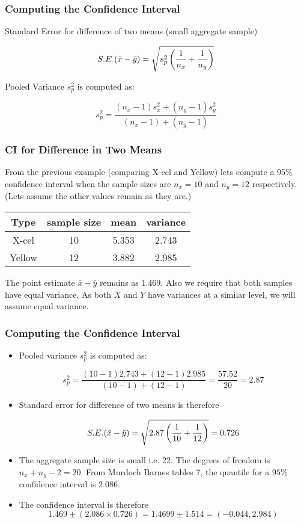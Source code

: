 \begin{frame}

\frametitle{Computing the Confidence Interval}
Standard Error for difference of two means (small aggregate sample)

\[ S.E.(\bar{x}-\bar{y}) = \sqrt{  s^2_p \left({1\over n_x}+{1\over n_y} \right)} \]

Pooled Variance $s^2_p$ is computed as:

\[ s^2_p = \frac{(n_x-1)s^2_x + (n_y-1)s^2_y}{(n_x-1) + (n_y-1)} \]
\end{frame}
\begin{frame}
\frametitle{CI for Difference in Two Means}
From the previous example (comparing X-cel and Yellow) lets compute a 95\% confidence interval when the sample sizes are $n_x=10$ and $n_y=12$ respectively. (Lets assume the other values remain as they are.)
\begin{center}
\begin{tabular}{|c|c|c|c|}
\hline
Type & sample size & mean & variance \\ \hline
X-cel & 10 & 5.353 & 2.743 \\ \hline
Yellow & 12 & 3.882 & 2.985 \\ \hline
\end{tabular}
\end{center}
The point estimate $\bar{x} - \bar{y}$ remains as 1.469. Also we require that both samples have equal variance. As both $X$ and $Y$ have variances at a similar level, we will assume equal variance.

\end{frame}
\begin{frame}

\frametitle{Computing the Confidence Interval}
\begin{itemize} \item Pooled variance $s^2_p$ is computed as:

\[ s^2_p = \frac{(10-1)2.743 + (12-1)2.985}{(10-1) + (12-1)}  = \frac{57.52}{20} = 2.87\]

\item Standard error for difference of two means is therefore

\[ S.E.(\bar{x}-\bar{y}) = \sqrt{  2.87 \left({1\over 10}+{1\over 12} \right)} = 0.726 \]

\item The aggregate sample size is small i.e. 22. The degrees of freedom is $n_x+n_y-2 = 20$.
From Murdoch Barnes tables 7, the quantile for a $95\%$ confidence interval is 2.086.

\item The confidence interval is therefore
\[ 1.469  \pm (2.086 \times 0.726) = 1.4699 \pm 1.514 =  (-0.044, 2.984 )  \]
\end{itemize}
\end{frame}

